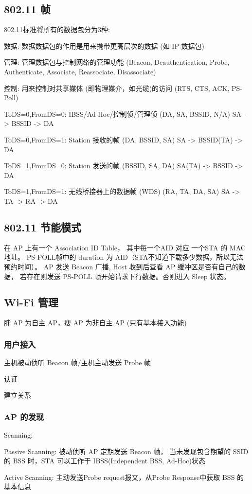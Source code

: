\documentclass[UTF8,cs4size]{ctexart}
\begin{document}
\subsection{802.11 帧}
802.11标准将所有的数据包分为3种:
\begin{compactitem}
  \item 数据: 数据数据包的作用是用来携带更高层次的数据 (如 IP 数据包)
  \item 管理: 管理数据包与控制网络的管理功能 (Beacon, Deauthentication, Probe, Authenticate, Associate, Reassociate, Disassociate)
  \item 控制: 用来控制对共享媒体 (即物理媒介，如光缆)的访问 (RTS, CTS, ACK, PS-Poll)
  \item ToDS=0,FromDS=0: IBSS/Ad-Hoc/控制侦/管理侦 (DA, SA, BSSID, N/A) SA -> BSSID -> DA
  \item ToDS=0,FromDS=1: Station 接收的帧 (DA, BSSID, SA) SA -> BSSID(TA) -> DA
  \item ToDS=1,FromDS=0: Station 发送的帧 (BSSID, SA, DA) SA(TA) -> BSSID -> DA
  \item ToDS=1,FromDS=1: 无线桥接器上的数据帧 (WDS) (RA, TA, DA, SA) SA -> TA -> RA -> DA
\end{compactitem}
\subsection{802.11 节能模式}
在 AP 上有一个 Association ID Table，
其中每一个AID 对应 一个STA 的 MAC 地址。
PS-POLL帧中的 duration 为 AID（STA不知道下载多少数据，所以无法预约时间）。
AP 发送 Beacon 广播, Host 收到后查看 AP 缓冲区是否有自己的数据，
若存在则发送 PS-POLL 帧开始请求下行数据。否则进入 Sleep 状态。
\subsection{Wi-Fi 管理}
胖 AP 为自主 AP，痩 AP 为非自主 AP (只有基本接入功能)
\subsubsection{用户接入}
\begin{compactitem}
  \item 主机被动侦听 Beacon 帧/主机主动发送 Probe 帧
  \item 认证
  \item 建立关系
\end{compactitem}
\subsubsection{AP 的发现}
Scanning:
\begin{compactitem}
  \item Passive Scanning: 被动侦听 AP 定期发送 Beacon 帧，
  当未发现包含期望的 SSID 的 BSS 时，STA 可以工作于 IBSS(Independent BSS, Ad-Hoc)状态
  \item Active Scanning: 主动发送Probe request报文，从Probe Response中获取 BSS 的基本信息
\end{compactitem}
\end{document}

